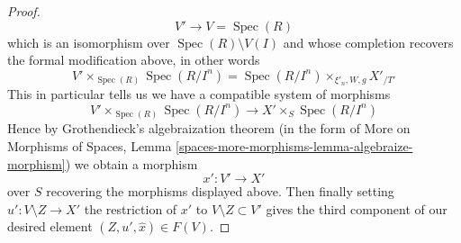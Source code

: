 \documentclass[10pt,a4paper]{amsart}
\theoremstyle{plain}
\theoremstyle{definition}
\theoremstyle{remark}
\numberwithin{equation}{subsection}
\def\Spec{\mathop{\mathrm{Spec}}}
\begin{document}
\begin{proof}
$$
V' \longrightarrow V = \Spec(R)
$$
which is an isomorphism over $\Spec(R) \setminus V(I)$ and
whose completion recovers the formal modification above, in other words
$$
V' \times_{\Spec(R)} \Spec(R/I^n) =
\Spec(R/I^n) \times_{\xi'_n, W, g} X'_{/T'}
$$
This in particular tells us we have a compatible system of morphisms
$$
V' \times_{\Spec(R)} \Spec(R/I^n) \longrightarrow X' \times_S \Spec(R/I^n)
$$
Hence by Grothendieck's algebraization theorem (in the form of
More on Morphisms of Spaces, Lemma
\ref{spaces-more-morphisms-lemma-algebraize-morphism})
we obtain a morphism
$$
x' : V' \to X'
$$
over $S$ recovering the morphisms displayed above. Then finally
setting $u' : V \setminus Z \to X'$ the restriction of $x'$ to
$V \setminus Z \subset V'$ gives the third component of our
desired element $(Z, u', \hat x) \in F(V)$.
\end{proof}
\end{document}
